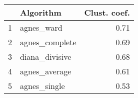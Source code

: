 \begin{tabular}{rlr}
  \toprule
 & Algorithm & Clust. coef. \\ 
  \midrule
1 & agnes\_ward & 0.71 \\ 
  2 & agnes\_complete & 0.69 \\ 
  3 & diana\_divisive & 0.68 \\ 
  4 & agnes\_average & 0.61 \\ 
  5 & agnes\_single & 0.53 \\ 
   \bottomrule
\end{tabular}

